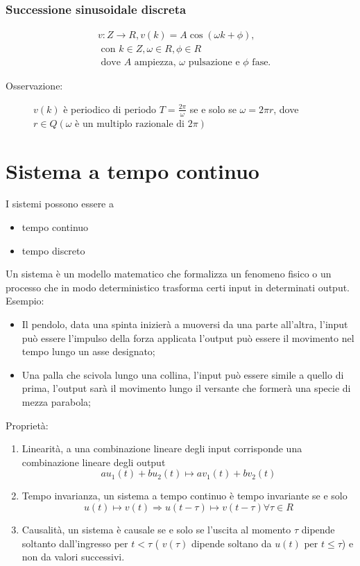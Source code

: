 \documentclass[a4paper, 12pt]{book}
\theoremstyle{plain}
\begin{document}
\subsection{Successione sinusoidale discreta}
\[
    \begin{split}
    &v: Z \rightarrow R, v(k) = A \cos (\omega k + \phi),\\
    &\textrm{ con } k \in Z, \omega \in R, \phi \in R\\
    &\textrm{ dove } A \textrm{ ampiezza, } \omega \textrm{ pulsazione e } \phi \textrm{ fase.} 
    \end{split}
\]

\begin{description}
    \item[Osservazione: ] $v(k)$ è periodico di periodo $T =  \frac{2\pi}{\omega}$ se e solo se 
    $\omega = 2\pi r$, dove $r \in Q (\omega \textrm{ è un multiplo razionale di } 2\pi)$  
\end{description}

\chapter{Sistema a tempo continuo}

I sistemi possono essere a 
\begin{itemize}
    \item tempo continuo
    \item tempo discreto
\end{itemize}

Un sistema è un modello matematico che formalizza un fenomeno fisico o un processo che in modo deterministico trasforma certi 
input in determinati output. Esempio:
\begin{itemize}
    \item Il pendolo, data una spinta inizierà a muoversi da una parte all'altra, l'input può essere l'impulso della forza applicata
    l'output può essere il movimento nel tempo lungo un asse designato;
    \item Una palla che scivola lungo una collina, l'input può essere simile a quello di prima, l'output sarà il movimento lungo il versante che formerà una specie di mezza parabola;
\end{itemize}

Proprietà:
\begin{enumerate}
    \item Linearità, a una combinazione lineare degli input corrisponde una combinazione lineare degli output 
    \[
        au_1(t) + bu_2(t) \mapsto  av_1(t) + bv_2(t)
    \]
    \item Tempo invarianza, un sistema a tempo continuo è tempo invariante se e solo 
    \[
        u(t) \mapsto v(t) \Rightarrow u(t - \tau) \mapsto v(t - \tau) \forall \tau \in R
    \]
    \item Causalità, un sistema è causale se e solo se l'uscita al momento $\tau$ dipende soltanto dall'ingresso per $t < \tau$ ( $v(\tau)$ dipende soltano
    da $u(t)$ per $t \le \tau$) e non da valori successivi.
\end{enumerate}
\end{document}

